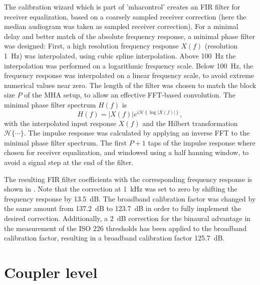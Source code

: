 \documentclass[11pt,a4paper,twoside]{article}
\begin{document}
The calibration wizard which is part of 'mhacontrol' creates an FIR
filter for receiver equalization, based on a coarsely sampled receiver
correction (here the median audiogram was taken as sampled receiver
correction).
%
For a minimal delay and better match of the absolute frequency
response, a minimal phase filter was designed:
%
First, a high resolution frequency response $X(f)$ (resolution 1~Hz)
was interpolated, using cubic spline interpolation.
%
Above 100~Hz the interpolation was performed on a logarithmic
frequency scale.
%
Below 100~Hz, the frequency response was interpolated on a linear
frequency scale, to avoid extreme numerical values near zero.
%
The length of the filter was chosen to match the block size $P$ of the
MHA setup, to allow an effective FFT-based convolution.
%
The minimal phase filter spectrum $H(f)$ is
%
\begin{equation}
  H(f) = |X(f)| e^{i \mathcal{H}\left\{\log|X(f)|\right\}},
\end{equation}
%
with the interpolated input response $X(f)$ and the Hilbert
transformation $\mathcal{H}\{\cdots\}$.
%
The impulse response was calculated by applying an inverse FFT to the
minimal phase filter spectrum.
%
The first $P+1$ taps of the impulse response where chosen for receiver
equalization, and windowed using a half hanning window, to avoid a
signal step at the end of the filter.

The resulting FIR filter coefficients with the corresponding frequency
response is shown in .
%
Note that the correction at 1~kHz was set to zero by shifting the
frequency response by 13.5~dB.
%
The broadband calibration factor was changed by the same amount from
137.2~dB to 123.7~dB in order to fully implement the desired
correction.
%
Additionally, a 2~dB correction for the binaural advantage in the
measurement of the ISO 226 thresholds has been applied to the
broadband calibration factor, resulting in a broadband calibration
factor 125.7~dB.



\section{Coupler level}
\end{document}
